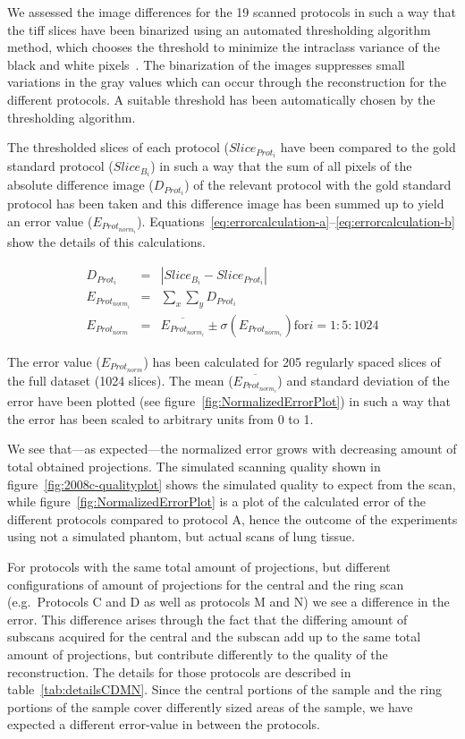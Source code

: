 We assessed the image differences for the 19 scanned protocols in such a way that the tiff slices have been binarized using an automated thresholding algorithm method, which chooses the threshold to minimize the intraclass variance of the black and white pixels~\cite{Otsu1979}. The binarization of the images suppresses small variations in the gray values which can occur through the reconstruction for the different protocols. A suitable threshold has been automatically chosen by the thresholding algorithm.

The thresholded slices of each protocol ($Slice_{Prot_{i}}$ have been compared to the gold standard protocol ($Slice_{B_{i}}$) in such a way that the sum of all pixels of the absolute difference image ($D_{Prot_{i}}$) of the relevant protocol with the gold standard protocol has been taken and this difference image has been summed up to yield an error value ($E_{Prot_{norm_{i}}}$). Equations~\ref{eq:errorcalculation-a}--\ref{eq:errorcalculation-b} show the details of this calculations.

\begin{eqnarray}
    D_{Prot_{i}} &=& |Slice_{B_{i}}-Slice_{Prot_{i}}| \label{eq:errorcalculation-a}\\
E_{Prot_{norm_{i}}} &=& \sum_{x}\sum_{y} D_{Prot_{i}} \label{eq:errorcalculation-b}\\
    E_{Prot_{norm}} &=& \overline{E_{Prot_{norm_{i}}}} \pm \sigma(E_{Prot_{norm_{i}}}) \mbox{for} i=1:5:1024 \label{eq:errorcalculation-c}
\end{eqnarray}

The error value ($E_{Prot_{norm}}$) has been calculated for 205 regularly spaced slices of the full dataset (1024 slices). The mean ($\overline{E_{Prot_{norm_{i}}}}$) and standard deviation of the error have been plotted (see figure~\ref{fig:NormalizedErrorPlot}) in such a way that the error has been scaled to arbitrary units from 0 to 1.

We see that---as expected---the normalized error grows with decreasing amount of total obtained projections. The simulated scanning quality shown in figure~\ref{fig:2008c-qualityplot} shows the simulated quality to expect from the scan, while figure~\ref{fig:NormalizedErrorPlot} is a plot of the calculated error of the different protocols compared to protocol A, hence the outcome of the experiments using not a simulated phantom, but actual scans of lung tissue.

For protocols with the same total amount of projections, but different configurations of amount of projections for the central and the ring scan (e.g.\ Protocols C and D as well as protocols M and N) we see a difference in the error. This difference arises through the fact that the differing amount of subscans acquired for the central and the subscan add up to the same total amount of projections, but contribute differently to the quality of the reconstruction. The details for those protocols are described in table~\ref{tab:detailsCDMN}. Since the central portions of the sample and the ring portions of the sample cover differently sized areas of the sample, we have expected a different error-value in between the protocols. 

